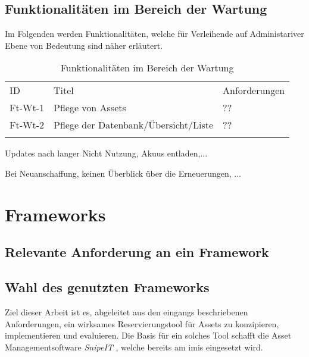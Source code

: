 \subsection{Funktionalitäten im Bereich der Wartung}
\label{subsec:ft-wartung}
Im Folgenden werden Funktionalitäten, welche für Verleihende auf Administariver Ebene von Bedeutung sind
näher erläutert. 
\begin{table}[h]
    \centering
    \caption{Funktionalitäten im Bereich der Wartung}
    \begin{tabular}{lll}
            \arrayrulecolor{maincolor}\hline
            \sffamily\color{maincolor}ID & \sffamily\color{maincolor}Titel &
            \sffamily\color{maincolor}Anforderungen \\
            \arrayrulecolor{maincolor}\hline
            Ft-Wt-1 & Pflege von Assets                  & ?? \\
            Ft-Wt-2 & Pflege der Datenbank/Übersicht/Liste            & ?? \\
            \arrayrulecolor{maincolor}\hline
    \end{tabular}
    \label{table:Ft-Wt}
\end{table}

Updates nach langer Nicht Nutzung, Akuus entladen,...

Bei Neuanschaffung, keinen Überblick über die Erneuerungen, ...


\section{Frameworks} 

\subsection{Relevante Anforderung an ein Framework}
\subsection{Wahl des genutzten Frameworks}
Ziel dieser Arbeit ist es, abgeleitet aus den eingangs beschriebenen Anforderungen, ein wirksames
Reservierungstool für Assets zu konzipieren, implementieren und evaluieren. Die Basis für ein
solches Tool schafft die Asset Managementsoftware \textit{SnipeIT} \cite{noauthor_home_nodate},
welche bereits am \ac{imis} eingesetzt wird.

